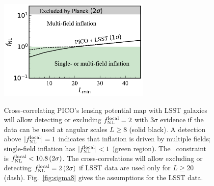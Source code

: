 \documentclass[PICOReport.tex]{subfiles}
\begin{document}
\begin{figure}[h]
\hspace{-0.in}
\parbox{3.0in}{{
\includegraphics[width=2.95in]{images/PICO_fnl_lmin_PICOv4.1b_deproj0_SENS0_LSST10yrGoldWithDropouts.pdf} } }   %
\hspace{0.in}
\parbox{3.4in}{
\caption{\captiontext
Cross-correlating PICO's lensing potential map with LSST galaxies will allow detecting or excluding  $f^{\rm local}_{\rm NL}=2$ with $3\sigma$ evidence  if the data can be used at  angular scales $L \ge 8$ (solid black). A detection above $|f^{\rm local}_{\rm NL}| =1$ indicates that inflation is driven by multiple fields; single-field inflation has $|f^{\rm local}_{\rm NL}|<1$ (green region). The \planck\ constraint is $f^{\rm local}_{\rm NL} < 10.8\, (2\sigma)$. The cross-correlations will allow excluding or detecting $f^{\rm local}_{\rm NL}=2\, (2\sigma)$ if LSST data are used only for $L\ge 20$ (dash). Fig.~\ref{fig:sigma8} gives the assumptions for the LSST data. 
\label{fig:fnlconstraint}
} }
\vspace{-0.1in}
\end{figure}

\end{document}
